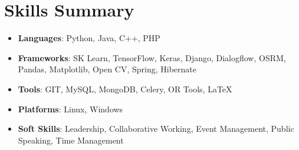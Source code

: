 \documentclass[a4paper,20pt]{article}
\newcommand{\resumeItem}[2]{
	\item\small{
		\textbf{#1}{: #2 \vspace{-2pt}}
	}
}
\newcommand{\resumeSubItem}[2]{\resumeItem{#1}{#2}\vspace{-3pt}}
\newcommand{\resumeSubHeadingListStart}{\begin{itemize}[leftmargin=*]}
\newcommand{\resumeSubHeadingListEnd}{\end{itemize}}
\begin{document}
	\section{Skills Summary}
	\resumeSubHeadingListStart
	\resumeSubItem{Languages}{\hspace{0.5cm}Python, Java, C++, PHP}
	\resumeSubItem{Frameworks}{\hspace{0.2cm}SK Learn, TensorFlow, Keras, Django, Dialogflow, OSRM, Pandas, Matplotlib, Open CV, Spring, Hibernate}
	\resumeSubItem{Tools}{\hspace{1.3cm}GIT, MySQL, MongoDB, Celery, OR Tools, LaTeX}
	\resumeSubItem{Platforms}{\hspace{0.6cm}Linux, Windows}
	\resumeSubItem{Soft Skills}{\hspace{0.56cm}Leadership, Collaborative Working, Event Management, Public Speaking, Time Management}
	
	\resumeSubHeadingListEnd
	\vspace{7pt}
	
	
	
	
		
\end{document}
